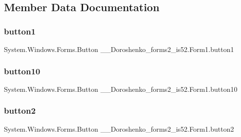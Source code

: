 \subsection{Member Data Documentation}
\hypertarget{class__7___doroshenko__forms2__is52_1_1_form1_aa89e62121bfbd844d17cec2d92efa369}{}\label{class__7___doroshenko__forms2__is52_1_1_form1_aa89e62121bfbd844d17cec2d92efa369} 
\subsubsection{\texorpdfstring{button1}{button1}}
{\footnotesize\ttfamily System.\+Windows.\+Forms.\+Button \+\_\+\_\+\+Doroshenko\+\_\+forms2\+\_\+is52.\+Form1.\+button1\hspace{0.3cm}{\ttfamily [private]}}

\hypertarget{class__7___doroshenko__forms2__is52_1_1_form1_a0f41d11a79c850781369ad4532f37cf9}{}\label{class__7___doroshenko__forms2__is52_1_1_form1_a0f41d11a79c850781369ad4532f37cf9} 
\subsubsection{\texorpdfstring{button10}{button10}}
{\footnotesize\ttfamily System.\+Windows.\+Forms.\+Button \+\_\+\_\+\+Doroshenko\+\_\+forms2\+\_\+is52.\+Form1.\+button10\hspace{0.3cm}{\ttfamily [private]}}

\hypertarget{class__7___doroshenko__forms2__is52_1_1_form1_a7376652113f624f301f0e56ba68850f8}{}\label{class__7___doroshenko__forms2__is52_1_1_form1_a7376652113f624f301f0e56ba68850f8} 
\subsubsection{\texorpdfstring{button2}{button2}}
{\footnotesize\ttfamily System.\+Windows.\+Forms.\+Button \+\_\+\_\+\+Doroshenko\+\_\+forms2\+\_\+is52.\+Form1.\+button2\hspace{0.3cm}{\ttfamily [private]}}

